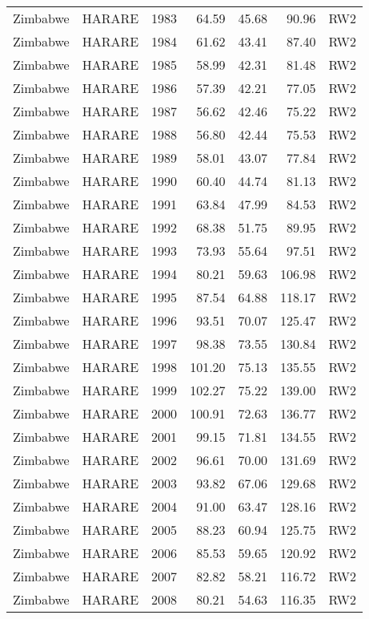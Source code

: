 \begin{longtable}{lllrrrl}
  Zimbabwe & HARARE & 1983 & 64.59 & 45.68 & 90.96 & RW2 \\ 
  Zimbabwe & HARARE & 1984 & 61.62 & 43.41 & 87.40 & RW2 \\ 
  Zimbabwe & HARARE & 1985 & 58.99 & 42.31 & 81.48 & RW2 \\ 
  Zimbabwe & HARARE & 1986 & 57.39 & 42.21 & 77.05 & RW2 \\ 
  Zimbabwe & HARARE & 1987 & 56.62 & 42.46 & 75.22 & RW2 \\ 
  Zimbabwe & HARARE & 1988 & 56.80 & 42.44 & 75.53 & RW2 \\ 
  Zimbabwe & HARARE & 1989 & 58.01 & 43.07 & 77.84 & RW2 \\ 
  Zimbabwe & HARARE & 1990 & 60.40 & 44.74 & 81.13 & RW2 \\ 
  Zimbabwe & HARARE & 1991 & 63.84 & 47.99 & 84.53 & RW2 \\ 
  Zimbabwe & HARARE & 1992 & 68.38 & 51.75 & 89.95 & RW2 \\ 
  Zimbabwe & HARARE & 1993 & 73.93 & 55.64 & 97.51 & RW2 \\ 
  Zimbabwe & HARARE & 1994 & 80.21 & 59.63 & 106.98 & RW2 \\ 
  Zimbabwe & HARARE & 1995 & 87.54 & 64.88 & 118.17 & RW2 \\ 
  Zimbabwe & HARARE & 1996 & 93.51 & 70.07 & 125.47 & RW2 \\ 
  Zimbabwe & HARARE & 1997 & 98.38 & 73.55 & 130.84 & RW2 \\ 
  Zimbabwe & HARARE & 1998 & 101.20 & 75.13 & 135.55 & RW2 \\ 
  Zimbabwe & HARARE & 1999 & 102.27 & 75.22 & 139.00 & RW2 \\ 
  Zimbabwe & HARARE & 2000 & 100.91 & 72.63 & 136.77 & RW2 \\ 
  Zimbabwe & HARARE & 2001 & 99.15 & 71.81 & 134.55 & RW2 \\ 
  Zimbabwe & HARARE & 2002 & 96.61 & 70.00 & 131.69 & RW2 \\ 
  Zimbabwe & HARARE & 2003 & 93.82 & 67.06 & 129.68 & RW2 \\ 
  Zimbabwe & HARARE & 2004 & 91.00 & 63.47 & 128.16 & RW2 \\ 
  Zimbabwe & HARARE & 2005 & 88.23 & 60.94 & 125.75 & RW2 \\ 
  Zimbabwe & HARARE & 2006 & 85.53 & 59.65 & 120.92 & RW2 \\ 
  Zimbabwe & HARARE & 2007 & 82.82 & 58.21 & 116.72 & RW2 \\ 
  Zimbabwe & HARARE & 2008 & 80.21 & 54.63 & 116.35 & RW2 \\ 

\end{longtable}
